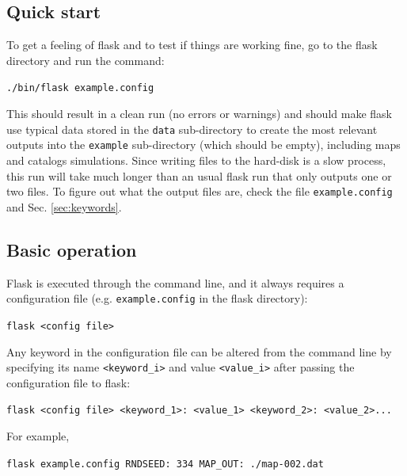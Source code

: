 \documentclass[12pt]{book} %
\begin{document}
\subsection{Quick start}
\label{sec:quick-start}

To get a feeling of {\sc flask} and to test if things are working fine, go to the {\sc flask} 
directory and run the command:

\vspace{0.5cm}
\noindent
{\tt ./bin/flask example.config}
\vspace{0.5cm}

\noindent
This should result in a clean run (no errors or warnings) and should make {\sc flask} 
use typical data stored in the {\tt data} sub-directory to create 
the most relevant outputs into the {\tt example} sub-directory (which should be empty), 
including maps and catalogs simulations. Since writing files to the hard-disk is a slow process, 
this run will take much longer than an usual {\sc flask} run that only outputs one or two files. 
To figure out what the output files are, check the file {\tt example.config} and Sec. 
\ref{sec:keywords}.
 
\subsection{Basic operation}
\label{sec:operation}

{\sc Flask} is executed through the command line, and it always requires a configuration file 
(e.g. {\tt example.config} in the {\sc flask} directory):

\vspace{0.5cm}
\noindent
{\tt flask <config file>}
\vspace{0.5cm}

Any keyword in the configuration file can be altered from the command line by specifying its 
name {\tt<keyword\_i>} and value {\tt<value\_i>} after passing the configuration file to {\sc flask}: 

\vspace{0.5cm}
\noindent
{\tt flask <config file> <keyword\_1>: <value\_1> <keyword\_2>: <value\_2>...}
\vspace{0.5cm}

\noindent
For example,

\vspace{0.5cm}
\noindent
{\tt flask example.config RNDSEED: 334 MAP\_OUT: ./map-002.dat}
\vspace{0.5cm}
\end{document}
